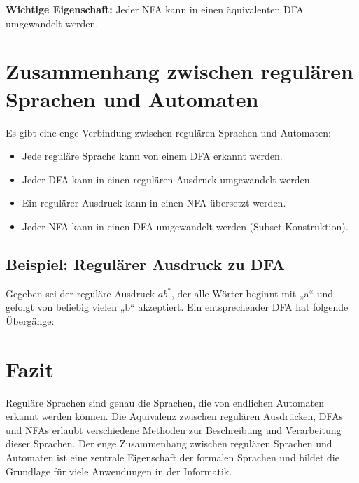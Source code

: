 \documentclass[a4paper,12pt]{article}
\begin{document}
	\textbf{Wichtige Eigenschaft:} Jeder NFA kann in einen äquivalenten DFA umgewandelt werden.
	
	\section{Zusammenhang zwischen regulären Sprachen und Automaten}
	
	Es gibt eine enge Verbindung zwischen regulären Sprachen und Automaten:
	
	\begin{itemize}
		\item Jede reguläre Sprache kann von einem DFA erkannt werden.
		\item Jeder DFA kann in einen regulären Ausdruck umgewandelt werden.
		\item Ein regulärer Ausdruck kann in einen NFA übersetzt werden.
		\item Jeder NFA kann in einen DFA umgewandelt werden (Subset-Konstruktion).
	\end{itemize}
	
	\subsection{Beispiel: Regulärer Ausdruck zu DFA}
	
	Gegeben sei der reguläre Ausdruck $ab^*$, der alle Wörter beginnt mit „a“ und gefolgt von beliebig vielen „b“ akzeptiert. Ein entsprechender DFA hat folgende Übergänge:
	
	\begin{center}
	\end{center}
	
	\section{Fazit}
	
	Reguläre Sprachen sind genau die Sprachen, die von endlichen Automaten erkannt werden können. Die Äquivalenz zwischen regulären Ausdrücken, DFAs und NFAs erlaubt verschiedene Methoden zur Beschreibung und Verarbeitung dieser Sprachen. Der enge Zusammenhang zwischen regulären Sprachen und Automaten ist eine zentrale Eigenschaft der formalen Sprachen und bildet die Grundlage für viele Anwendungen in der Informatik.
	
\end{document}
